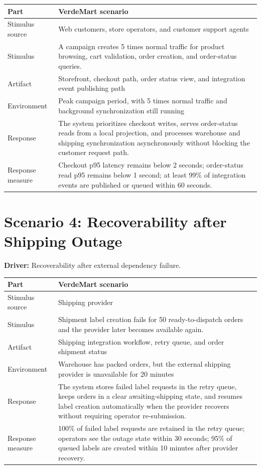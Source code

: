 \begin{center}
\begin{tabular}{|p{}|p{}|}
\hline
\textbf{Part} & \textbf{VerdeMart scenario} \\
\hline
Stimulus source & Web customers, store operators, and customer support agents \\
\hline
Stimulus & A campaign creates 5 times normal traffic for product browsing, cart validation, order creation, and order-status queries. \\
\hline
Artifact & Storefront, checkout path, order status view, and integration event publishing path \\
\hline
Environment & Peak campaign period, with 5 times normal traffic and background synchronization still running \\
\hline
Response & The system prioritizes checkout writes, serves order-status reads from a local projection, and processes warehouse and shipping synchronization asynchronously without blocking the customer request path. \\
\hline
Response measure & Checkout p95 latency remains below 2 seconds; order-status read p95 remains below 1 second; at least 99\% of integration events are published or queued within 60 seconds. \\
\hline
\end{tabular}
\end{center}

\section{Scenario 4: Recoverability after Shipping Outage}

\textbf{Driver:} Recoverability after external dependency failure.

\begin{center}
\begin{tabular}{|p{}|p{}|}
\hline
\textbf{Part} & \textbf{VerdeMart scenario} \\
\hline
Stimulus source & Shipping provider \\
\hline
Stimulus & Shipment label creation fails for 50 ready-to-dispatch orders and the provider later becomes available again. \\
\hline
Artifact & Shipping integration workflow, retry queue, and order shipment status \\
\hline
Environment & Warehouse has packed orders, but the external shipping provider is unavailable for 20 minutes \\
\hline
Response & The system stores failed label requests in the retry queue, keeps orders in a clear awaiting-shipping state, and resumes label creation automatically when the provider recovers without requiring operator re-submission. \\
\hline
Response measure & 100\% of failed label requests are retained in the retry queue; operators see the outage state within 30 seconds; 95\% of queued labels are created within 10 minutes after provider recovery. \\
\hline
\end{tabular}
\end{center}

